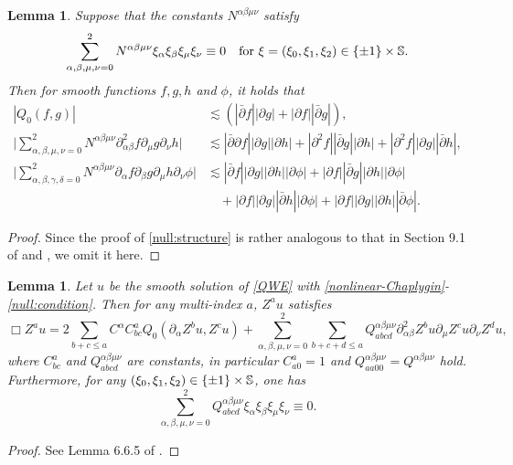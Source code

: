 \documentclass[11pt,twoside]{article}
\def\SS{\mathop{\mathbb S\kern 0pt}\nolimits}
\def\p{\partial}
\def\ls{\lesssim}
\theoremstyle{plain}
\newtheorem{lemma}[theorem]{Lemma}
\theoremstyle{definition}
\numberwithin{equation}{section}
\begin{document}
\begin{lemma}\label{lem:null:structure}
Suppose that the constants $N^{\alpha\beta\mu\nu}$ satisfy
\begin{equation*}
\sum_{\alpha,\beta,\mu,\nu=0}^2N^{\alpha\beta\mu\nu}\xi_\alpha\xi_\beta\xi_\mu\xi_\nu\equiv0
\quad\text{for $\xi=(\xi_0,\xi_1,\xi_2)\in\{\pm1\}\times\SS$.}
\end{equation*}
Then for smooth functions $f,g,h$ and $\phi$, it holds that
\begin{equation}\label{null:structure}
\begin{split}
|Q_0(f,g)|&\ls(|\bar\p f||\p g|+|\p f||\bar\p g|),\\
\Big|\sum_{\alpha,\beta,\mu,\nu=0}^2N^{\alpha\beta\mu\nu}
\p^2_{\alpha\beta}f\p_{\mu}g\p_{\nu}h\Big|&\ls|\bar\p\p f||\p g||\p h|+|\p^2f||\bar\p g||\p h|+|\p^2f||\p g||\bar\p h|,\\
\Big|\sum_{\alpha,\beta,\gamma,\delta=0}^2N^{\alpha\beta\mu\nu}
\p_{\alpha}f\p_{\beta}g\p_{\mu}h\p_{\nu}\phi\Big|&\ls|\bar\p f||\p g||\p h||\p\phi|+|\p f||\bar\p g||\p h||\p\phi|\\
&\quad+|\p f||\p g||\bar\p h||\p\phi|+|\p f||\p g||\p h||\bar\p\phi|.
\end{split}
\end{equation}
\end{lemma}
\begin{proof}
Since the proof of \eqref{null:structure} is rather analogous to that in Section 9.1 of \cite{Alinhac:book}
and \cite[Lemma 2.2]{HouYin20jde}, we omit it here.
\end{proof}


\begin{lemma}\label{lem:eqn:high}
Let $u$ be the smooth solution of \eqref{QWE} with \eqref{nonlinear-Chaplygin}-\eqref{null:condition}.
Then for any multi-index $a$, $Z^au$ satisfies
\begin{equation}\label{eqn:high}
\Box Z^au=2\sum_{b+c\le a}C^{\alpha}C^a_{bc}Q_0(\p_{\alpha}Z^bu,Z^cu)
+\sum_{\alpha,\beta,\mu,\nu=0}^2\sum_{b+c+d\le a}Q^{\alpha\beta\mu\nu}_{abcd}\p^2_{\alpha\beta}Z^bu\p_{\mu}Z^cu\p_{\nu}Z^du,
\end{equation}
where $C^a_{bc}$ and $Q_{abcd}^{\alpha\beta\mu\nu}$ are constants, in particular $C^a_{a0}=1$
and $Q_{aa00}^{\alpha\beta\mu\nu}=Q^{\alpha\beta\mu\nu}$ hold.
Furthermore, for any $(\xi_0,\xi_1,\xi_2)\in\{\pm1\}\times\SS$, one has
\begin{equation}\label{null:high}
\sum_{\alpha,\beta,\mu,\nu=0}^2Q_{abcd}^{\alpha\beta\mu\nu}\xi_\alpha\xi_\beta\xi_\mu\xi_\nu\equiv0.
\end{equation}
\end{lemma}
\begin{proof}
See Lemma 6.6.5 of \cite{Hormander97book}.
\end{proof}
\end{document}
